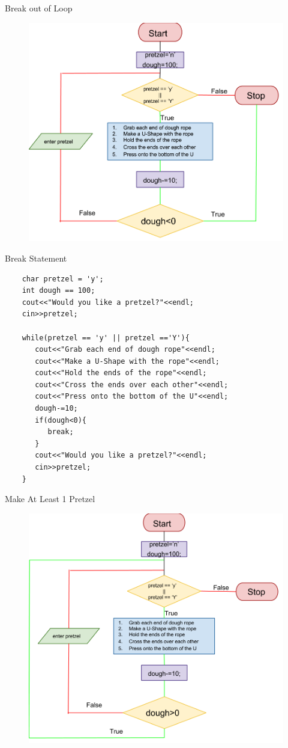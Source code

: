\documentclass[xcolor={dvipsnames}]{beamer}
\begin{document}
\begin{frame}{Break out of Loop}
	\begin{figure}
		\includegraphics[width=.8\textwidth]{break_pretzels}
	\end{figure}
\end{frame}

\begin{frame}[fragile]{Break Statement}
\begin{verbatim}
    char pretzel = 'y';
    int dough == 100;
    cout<<"Would you like a pretzel?"<<endl;
    cin>>pretzel;

    while(pretzel == 'y' || pretzel =='Y'){
       cout<<"Grab each end of dough rope"<<endl;
       cout<<"Make a U-Shape with the rope"<<endl;
       cout<<"Hold the ends of the rope"<<endl;
       cout<<"Cross the ends over each other"<<endl;
       cout<<"Press onto the bottom of the U"<<endl; 
       dough-=10;
       if(dough<0){
          break;     
       }
       cout<<"Would you like a pretzel?"<<endl;
       cin>>pretzel;
    }
\end{verbatim}
\end{frame}

\begin{frame}{Make At Least 1 Pretzel}
	\begin{figure}
		\includegraphics[width=.8\textwidth]{continue_pretzels}
	\end{figure}
\end{frame}
\end{document}

